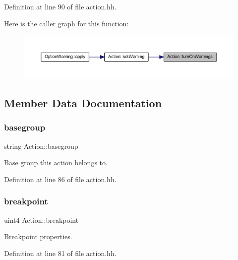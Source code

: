 Definition at line 90 of file action.\+hh.

Here is the caller graph for this function\+:
\nopagebreak
\begin{figure}[H]
\begin{center}
\leavevmode
\includegraphics[width=350pt]{class_action_a5784987d90d4ab2cac5c91c32e24c602_icgraph}
\end{center}
\end{figure}


\subsection{Member Data Documentation}
\mbox{\label{class_action_a5b149636900891c8b1f1ff1ab187e1d0}} 
\subsubsection{\texorpdfstring{basegroup}{basegroup}}
{\footnotesize\ttfamily string Action\+::basegroup\hspace{0.3cm}{\ttfamily [protected]}}



Base group this action belongs to. 



Definition at line 86 of file action.\+hh.

\mbox{\label{class_action_a9389b626998d8725f9523188d3f2ef78}} 
\subsubsection{\texorpdfstring{breakpoint}{breakpoint}}
{\footnotesize\ttfamily uint4 Action\+::breakpoint\hspace{0.3cm}{\ttfamily [protected]}}



Breakpoint properties. 



Definition at line 81 of file action.\+hh.

